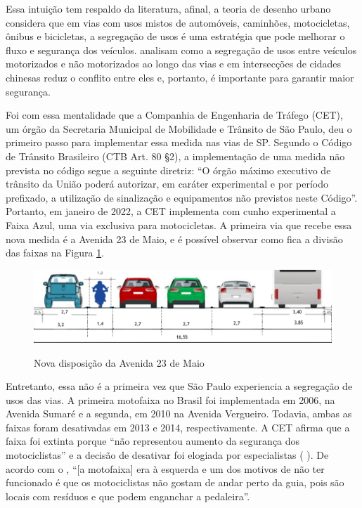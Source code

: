 Essa intuição tem respaldo da literatura, afinal, a teoria de desenho urbano considera que em vias com usos mistos de automóveis, caminhões, motocicletas, ônibus e bicicletas, a segregação de usos é uma estratégia que pode melhorar o fluxo e segurança dos veículos. \textcite{jun1992traffic} analisam como a segregação de usos entre veículos motorizados e não motorizados ao longo das vias e em intersecções de cidades chinesas reduz o conflito entre eles e, portanto, é importante para garantir maior segurança.

Foi com essa mentalidade que a Companhia de Engenharia de Tráfego (CET), um órgão da Secretaria Municipal de Mobilidade e Trânsito de São Paulo, deu o primeiro passo para implementar essa medida nas vias de SP. Segundo o Código de Trânsito Brasileiro (CTB Art. 80 \S 2), a implementação de uma medida não prevista no código segue a seguinte diretriz: ``O órgão máximo executivo de trânsito da União poderá autorizar, em caráter experimental e por período prefixado, a utilização de sinalização e equipamentos não previstos neste Código''. Portanto, em janeiro de 2022, a CET implementa com cunho experimental a Faixa Azul, uma via exclusiva para motocicletas. A primeira via que recebe essa nova medida é a Avenida 23 de Maio, e é possível observar como fica a divisão das faixas na Figura \ref{fig:23maio}.

\begin{figure}[h]
    \centering
    \caption{Nova disposição da Avenida 23 de Maio}
    \includegraphics[width = 0.9\linewidth]{relatorios/faixa-azul/figuras/render_faixa_azul.png}
    \label{fig:23maio}
\end{figure}

Entretanto, essa não é a primeira vez que São Paulo experiencia a segregação de usos das vias. A primeira motofaixa no Brasil foi implementada em 2006, na Avenida Sumaré e a segunda, em 2010 na Avenida Vergueiro. Todavia, ambas as faixas foram desativadas em 2013 e 2014, respectivamente. A CET afirma que a faixa foi extinta porque ``não representou aumento da segurança dos motociclistas'' e a decisão de desativar foi elogiada por especialistas ( ). De acordo com o \textcite{origemFaixaAzul}, ``[a motofaixa] era à esquerda e um dos motivos de não ter funcionado é que os motociclistas não gostam de andar perto da guia, pois são locais com resíduos e que podem enganchar a pedaleira''.

